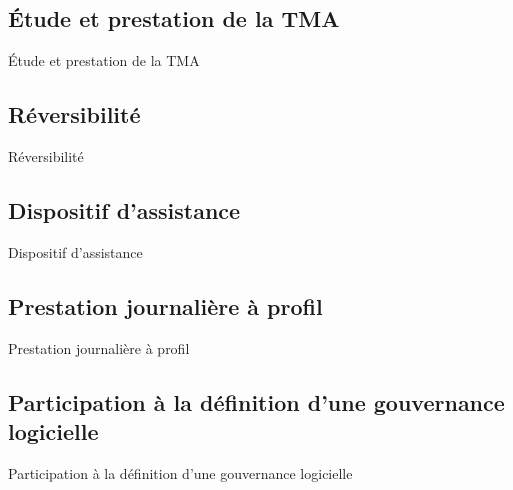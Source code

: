 \ZacSpeak
\subsection{Étude et prestation de la TMA}
\begin{frame}{Étude et prestation de la TMA}
\end{frame}
\DylanSpeak
\subsection{Réversibilité}
\begin{frame}{Réversibilité}
\end{frame}
\AntoineSpeak
\subsection{Dispositif d'assistance}
\begin{frame}{Dispositif d'assistance}
\end{frame}
\DylanSpeak
\subsection{Prestation journalière à profil}
\begin{frame}{Prestation journalière à profil}
\end{frame}
\DylanSpeak
\subsection{Participation à la définition d'une gouvernance logicielle}
\begin{frame}{Participation à la définition d'une gouvernance logicielle}
\end{frame}